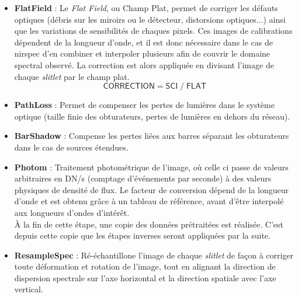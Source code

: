 \documentclass[12pt, a4paper]{article}
\begin{document}
\begin{itemize}
  \item \textbf{FlatField} : Le \textit{Flat Field}, ou Champ Plat, permet de corriger les défauts optiques (débris sur les miroirs ou le détecteur, distorsions optiques...) ainsi que les variations de sensibilités de chaques pixels. Ces images de calibrations dépendent de la longueur d'onde, et il est donc nécessaire dans le cas de \gls{nirspec} d'en combiner et interpoler plusieurs afin de couvrir le domaine spectral observé. La correction est alors appliquée en divisant l'image de chaque \textit{slitlet} par le champ plat.
  \begin{equation}
    \mathsf{CORRECTION} = \mathsf{SCI} \; / \; \mathsf{FLAT} 
  \end{equation}

  \item \textbf{PathLoss} : Permet de compenser les pertes de lumières dans le système optique (taille finie des obturateurs, pertes de lumières en dehors du réseau).
  
  \item \textbf{BarShadow} : Compense les pertes liées aux barres séparant les obturateurs dans le cas de sources étendues.
  
  \item \textbf{Photom} : Traitement photométrique de l'image, où celle ci passe de valeurs arbitraires en DN/s (comptage d'événements par seconde) à des valeurs physiques de densité de flux. Le facteur de conversion dépend de la longueur d'onde et est obtenu grâce à un tableau de référence, avant d'être interpolé aux longueurs d'ondes d'intérêt.\\
  
  À la fin de cette étape, une copie des données prétraitées est réalisée. C'est depuis cette copie que les étapes inverses seront appliquées par la suite.
  
  \item \textbf{ResampleSpec} : Ré-échantillone l'image de chaque \textit{slitlet} de façon à corriger toute déformation et rotation de l'image, tout en alignant la direction de dispersion spectrale sur l'axe horizontal et la direction spatiale avec l'axe vertical.
\end{itemize}
\end{document}
